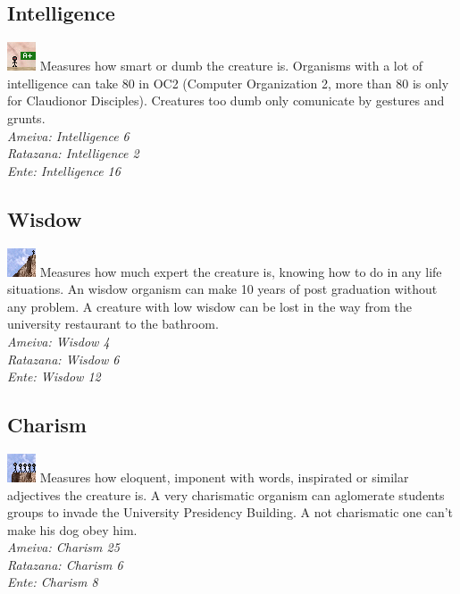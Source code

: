 \documentclass[ letterpaper,12pt]{article}
\begin{document}
\subsection{Intelligence}
\includegraphics{../data/skills/Img/inteligencia.png}
Measures how smart or dumb the creature is. Organisms with a lot of intelligence can take 80 in OC2 (Computer Organization 2, more than 80 is only for Claudionor Disciples). Creatures too dumb only comunicate by gestures and grunts.\\
{\it Ameiva: Intelligence 6\\
Ratazana: Intelligence 2\\
Ente: Intelligence 16\\}

\subsection{Wisdow}
\includegraphics{../data/skills/Img/sabedoria.png}
Measures how much expert the creature is, knowing how to do in any life situations. An wisdow organism can make 10 years of post graduation without any problem. A creature with low wisdow can be lost in the way from the university restaurant to the bathroom.\\
{\it Ameiva: Wisdow 4\\
Ratazana: Wisdow 6\\
Ente: Wisdow 12}

\subsection{Charism}
\includegraphics{../data/skills/Img/carisma.png}
Measures how eloquent, imponent with words, inspirated or similar adjectives the creature is. A very charismatic organism can aglomerate students groups to invade the University Presidency Building. A not charismatic one can't make his dog obey him.\\
{\it Ameiva: Charism 25\\
Ratazana: Charism 6\\
Ente: Charism 8}
\end{document}
